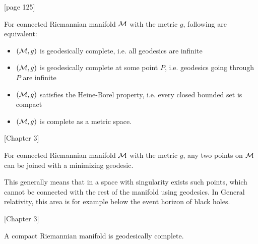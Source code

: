 \begin{thm}\citep{petersen}[page 125]
    \label{thm:hopf-Rinow}


    For connected Riemannian manifold $\mathcal{M}$ with the metric $g$, following are equivalent:
    \begin{itemize}
        \item $(\mathcal{M},g)$ is geodesically complete, i.e. all geodesics are infinite
        \item $(\mathcal{M},g)$ is geodesically complete at some point $P$, i.e. geodesics going through $P$ are infinite
        \item $(\mathcal{M},g)$ satisfies the Heine-Borel property, i.e. every closed bounded set is compact
        \item $(\mathcal{M},g)$ is complete as a metric space.
    \end{itemize}
\end{thm}
\begin{thm}\citep{claudio}[Chapter 3]
    \label{thm:hopf-Rinow_modified}

    For connected Riemannian manifold $\mathcal{M}$ with the metric $g$, any two points on $\mathcal{M}$ can be joined with a minimizing geodesic.
\end{thm}
This generally means that in a space with singularity exists such points, which cannot be connected with the rest of the manifold using geodesics. In General relativity, this area is for example below the event horizon of black holes.

\begin{thm}\citep{claudio}[Chapter 3]
    \label{thm:compact}

    A compact Riemannian manifold is geodesically complete.
\end{thm}





